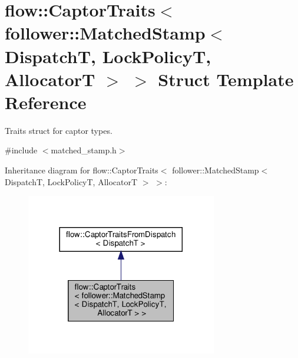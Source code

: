 \hypertarget{structflow_1_1_captor_traits_3_01follower_1_1_matched_stamp_3_01_dispatch_t_00_01_lock_policy_t_00_01_allocator_t_01_4_01_4}{}\section{flow\+:\+:Captor\+Traits$<$ follower\+:\+:Matched\+Stamp$<$ DispatchT, Lock\+PolicyT, AllocatorT $>$ $>$ Struct Template Reference}
\label{structflow_1_1_captor_traits_3_01follower_1_1_matched_stamp_3_01_dispatch_t_00_01_lock_policy_t_00_01_allocator_t_01_4_01_4}


Traits struct for captor types.  




{\ttfamily \#include $<$matched\+\_\+stamp.\+h$>$}



Inheritance diagram for flow\+:\+:Captor\+Traits$<$ follower\+:\+:Matched\+Stamp$<$ DispatchT, Lock\+PolicyT, AllocatorT $>$ $>$\+:\nopagebreak
\begin{figure}[H]
\begin{center}
\leavevmode
\includegraphics[width=236pt]{structflow_1_1_captor_traits_3_01follower_1_1_matched_stamp_3_01_dispatch_t_00_01_lock_policy_t_8d2f654fee87b82e7efd47ee1d04042d}
\end{center}
\end{figure}


